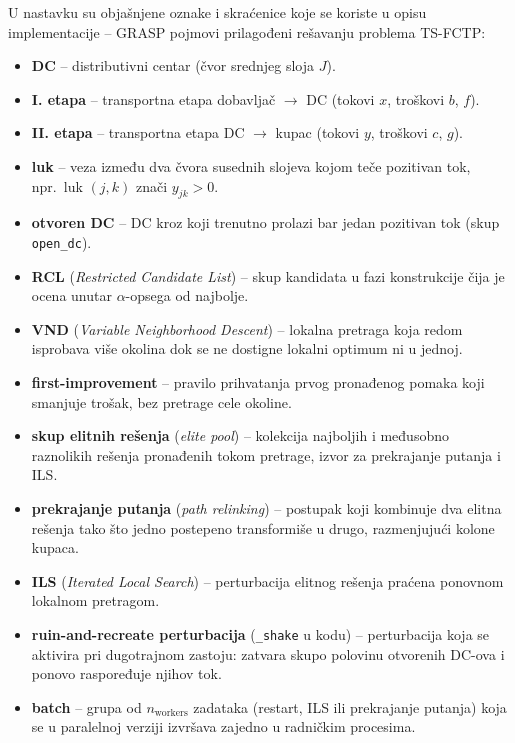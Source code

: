\documentclass[12pt,a4paper]{article}
\begin{document}
U nastavku su objašnjene oznake i skraćenice koje se koriste u opisu
implementacije -- GRASP pojmovi prilagođeni rešavanju problema TS-FCTP:
\begin{itemize}
  \item \textbf{DC} -- distributivni centar (čvor srednjeg sloja $J$).
  \item \textbf{I. etapa} -- transportna etapa dobavljač $\to$ DC (tokovi
    $x$, troškovi $b$, $f$).
  \item \textbf{II. etapa} -- transportna etapa DC $\to$ kupac (tokovi $y$,
    troškovi $c$, $g$).
  \item \textbf{luk} -- veza između dva čvora susednih slojeva kojom teče
    pozitivan tok, npr.\ luk $(j,k)$ znači $y_{jk} > 0$.
  \item \textbf{otvoren DC} -- DC kroz koji trenutno prolazi bar jedan
    pozitivan tok (skup \texttt{open\_dc}).
  \item \textbf{RCL} (\textit{Restricted Candidate List}) -- skup kandidata
    u fazi konstrukcije čija je ocena unutar $\alpha$-opsega od najbolje.
  \item \textbf{VND} (\textit{Variable Neighborhood Descent}) -- lokalna
    pretraga koja redom isprobava više okolina dok se ne dostigne lokalni
    optimum ni u jednoj.
  \item \textbf{first-improvement} -- pravilo prihvatanja prvog pronađenog
    pomaka koji smanjuje trošak, bez pretrage cele okoline.
  \item \textbf{skup elitnih rešenja} (\textit{elite pool}) -- kolekcija
    najboljih i međusobno raznolikih rešenja pronađenih tokom pretrage,
    izvor za prekrajanje putanja i ILS.
  \item \textbf{prekrajanje putanja} (\textit{path relinking}) -- postupak
    koji kombinuje dva elitna rešenja tako što jedno postepeno transformiše
    u drugo, razmenjujući kolone kupaca.
  \item \textbf{ILS} (\textit{Iterated Local Search}) -- perturbacija
    elitnog rešenja praćena ponovnom lokalnom pretragom.
  \item \textbf{ruin-and-recreate perturbacija} (\texttt{\_shake} u kodu) --
    perturbacija koja se aktivira pri dugotrajnom zastoju: zatvara skupo
    polovinu otvorenih DC-ova i ponovo raspoređuje njihov tok.
  \item \textbf{batch} -- grupa od $n_{\text{workers}}$ zadataka (restart,
    ILS ili prekrajanje putanja) koja se u paralelnoj verziji izvršava
    zajedno u radničkim procesima.
\end{itemize}
\end{document}
